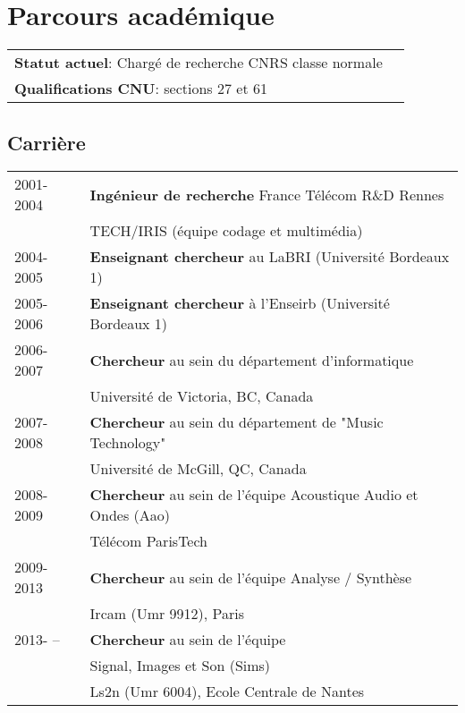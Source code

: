 \chapter{Parcours académique}

\begin{tabular}{lr}
{\bf  Statut actuel}: Chargé de recherche CNRS classe normale  \\
  {\bf Qualifications CNU}:
  sections 27 et 61\\
\end{tabular}

\section{Carrière}
\begin{tabular}{ll}
  2001-2004 & {\bf Ingénieur de recherche}  France Télécom R\&D Rennes \\
  & TECH/IRIS (équipe codage et multimédia) \\
  2004-2005 & {\bf Enseignant chercheur} au LaBRI (Université Bordeaux 1) \\
  2005-2006 & {\bf Enseignant chercheur}  à l'Enseirb (Université Bordeaux 1) \\
  2006-2007 & {\bf Chercheur} au sein du département d'informatique \\
  &  Université de Victoria, BC, Canada \\
 2007-2008 &  {\bf Chercheur} au sein du département de  "Music Technology"  \\
  &  Université de McGill, QC, Canada \\
 2008- 2009 &  {\bf Chercheur} au sein de  l'équipe  Acoustique Audio et Ondes (Aao)  \\
  & Télécom ParisTech \\
 2009-2013 &  {\bf Chercheur} au sein de l'équipe Analyse / Synthèse  \\
  & Ircam (Umr 9912), Paris \\
 2013- -- &  {\bf Chercheur} au sein de l'équipe \\
 & Signal, Images et Son (Sims)  \\
  & Ls2n (Umr 6004), Ecole Centrale de Nantes \\

\end{tabular}

